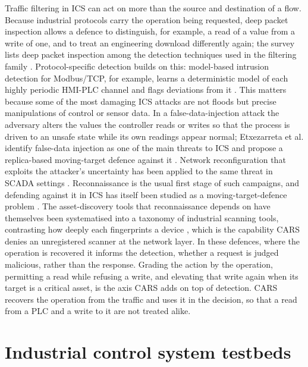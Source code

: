 Traffic filtering in ICS can act on more than the source and destination of a flow. Because industrial protocols carry the operation being requested, deep packet inspection allows a defence to distinguish, for example, a read of a value from a write of one, and to treat an engineering download differently again; the survey lists deep packet inspection among the detection techniques used in the filtering family \cite{etxezarreta2023survey}. Protocol-specific detection builds on this: model-based intrusion detection for Modbus/TCP, for example, learns a deterministic model of each highly periodic HMI-PLC channel and flags deviations from it \cite{goldenberg2013modbus}. This matters because some of the most damaging ICS attacks are not floods but precise manipulations of control or sensor data. In a false-data-injection attack the adversary alters the values the controller reads or writes so that the process is driven to an unsafe state while its own readings appear normal; Etxezarreta et al. identify false-data injection as one of the main threats to ICS and propose a replica-based moving-target defence against it \cite{etxezarreta2026replica}. Network reconfiguration that exploits the attacker's uncertainty has been applied to the same threat in SCADA settings \cite{kpoze2025reconfig}. Reconnaissance is the usual first stage of such campaigns, and defending against it in ICS has itself been studied as a moving-target-defence problem \cite{samanis2025phd}. The asset-discovery tools that reconnaissance depends on have themselves been systematised into a taxonomy of industrial scanning tools, contrasting how deeply each fingerprints a device \cite{samanis2022sok}, which is the capability CARS denies an unregistered scanner at the network layer. In these defences, where the operation is recovered it informs the detection, whether a request is judged malicious, rather than the response. Grading the action by the operation, permitting a read while refusing a write, and elevating that write again when its target is a critical asset, is the axis CARS adds on top of detection. CARS recovers the operation from the traffic and uses it in the decision, so that a read from a PLC and a write to it are not treated alike.

\section{Industrial control system testbeds}
\label{sec:testbeds}

